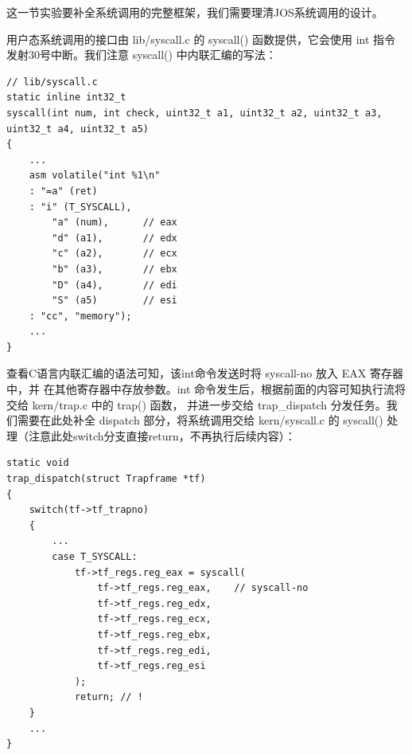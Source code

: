 \documentclass[12pt, letterpaper]{report}
\begin{document}
这一节实验要补全系统调用的完整框架，我们需要理清JOS系统调用的设计。\par 
用户态系统调用的接口由 lib/syscall.c 的 syscall() 函数提供，它会使用 int 指令
发射30号中断。我们注意 syscall() 中内联汇编的写法：\par 
\newpage
\lstset{style=CStyle}
\setmainfont{Consolas}
\begin{lstlisting}
// lib/syscall.c
static inline int32_t
syscall(int num, int check, uint32_t a1, uint32_t a2, uint32_t a3, uint32_t a4, uint32_t a5)
{
    ...
    asm volatile("int %1\n"
    : "=a" (ret)
    : "i" (T_SYSCALL),
        "a" (num),      // eax
        "d" (a1),       // edx
        "c" (a2),       // ecx
        "b" (a3),       // ebx
        "D" (a4),       // edi
        "S" (a5)        // esi
    : "cc", "memory");
    ...
}
\end{lstlisting}
\setmainfont{Times New Roman}
查看C语言内联汇编的语法可知，该int命令发送时将 syscall-no 放入 EAX 寄存器中，并
在其他寄存器中存放参数。int 命令发生后，根据前面的内容可知执行流将交给 kern/trap.c 中的 trap() 函数，
并进一步交给 trap\_dispatch 分发任务。我们需要在此处补全 dispatch 部分，将系统调用交给 kern/syscall.c 的
syscall() 处理（注意此处switch分支直接return，不再执行后续内容）：\par 
\lstset{style=CStyle}
\setmainfont{Consolas}
\begin{lstlisting}
static void
trap_dispatch(struct Trapframe *tf)
{
    switch(tf->tf_trapno)
    {
        ...
        case T_SYSCALL:
            tf->tf_regs.reg_eax = syscall(
                tf->tf_regs.reg_eax,	// syscall-no
                tf->tf_regs.reg_edx,
                tf->tf_regs.reg_ecx,
                tf->tf_regs.reg_ebx,
                tf->tf_regs.reg_edi,
                tf->tf_regs.reg_esi
            );
            return;	// !
    }
    ...
}
\end{lstlisting}
\setmainfont{Times New Roman}
\end{document}
